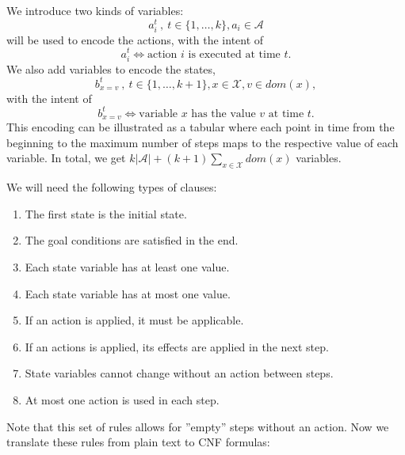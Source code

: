 \documentclass{article}
\theoremstyle{definition}
\begin{document}
We introduce two kinds of variables: \[a_i^t\ ,\ t \in \{1, \ldots, k\}, a_i \in \mathcal{A}\] will be used to encode the actions, with the intent of \[a_i^t \Leftrightarrow \text{action $i$ is executed at time $t$.}\] We also add variables to encode the states, \[b_{x=v}^t\ ,\ t\in \{1, \ldots, k+1\}, x \in \mathcal{X}, v \in \textit{dom}(x),\] with the intent of \[b_{x=v}^t \Leftrightarrow \text{variable $x$ has the value $v$ at time $t$}.\] This encoding can be illustrated as a tabular where each point in time from the beginning to the maximum number of steps maps to the respective value of each variable. In total, we get $k |\mathcal{A}| + (k+1) \sum_{x \in \mathcal{X}} \textit{dom}(x)$ variables.

We will need the following types of clauses:
\begin{enumerate}
\item The first state is the initial state.
\item The goal conditions are satisfied in the end.
\item Each state variable has at least one value.
\item Each state variable has at most one value.
\item If an action is applied, it must be applicable.
\item If an actions is applied, its effects are applied in the next step.
\item State variables cannot change without an action between steps.
\item At most one action is used in each step.
\end{enumerate}

\noindent Note that this set of rules allows for ''empty'' steps without an action. Now we translate these rules from plain text to CNF formulas:
\end{document}
